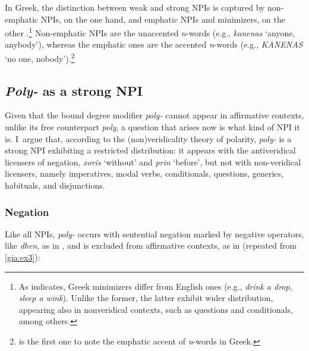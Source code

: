 \documentclass[output=paper]{langscibook}
\begin{document}
\noindent In Greek, the distinction between weak and strong NPIs is captured by non-emphatic NPIs, on the one hand, and emphatic NPIs and minimizers, on the other \citep{giannaki1997dissert,giannaki1998}.\footnote{As \citet{giannaki1997dissert,giannaki1998} indicates, Greek minimizers differ from English ones (e.g., \textit{drink a drop, sleep a wink}). Unlike the former, the latter exhibit wider distribution, appearing also in nonveridical contexts, such as questions and conditionals, among others.} Non-emphatic NPIs are the unaccented \textit{n}-words (e.g., \textit{kanenas} `anyone, anybody'), whereas the emphatic ones are the accented \textit{n}-words (e.g., \textit{KANENAS} `no one, nobody').\footnote{\citet{velou19834} is the first one to note the emphatic accent of \textit{n}-words in Greek.}

\subsection{\textit{Poly-} as a strong NPI} \label{gia:sub:strongpoly-}

Given that the bound degree modifier \textit{poly-} cannot appear in affirmative contexts, unlike its free counterpart \textit{poly}, a question that arises now is what kind of NPI it is. I~argue that, according to the (non)veridicality theory of polarity, \textit{poly-} is a strong NPI exhibiting a restricted distribution: it appears with the antiveridical licensers of negation, \textit{xoris} ‘without’ and \textit{prin} `before', but not with non-veridical licensers, namely imperatives, modal verbs, conditionals, questions, generics, habituals, and disjunctions.

\subsubsection{Negation}

\noindent Like all NPIs, \textit{poly-} occurs with sentential negation marked by negative operators, like \textit{dhen}, as in , and is excluded from affirmative contexts, as in  (repeated from \ref{gia:ex3}):

\begin{exe}
\ex\label{gia:ex8} \begin{xlist}
        \label{gia:ex8b}
    \end{xlist}
\end{exe}
\end{document}
